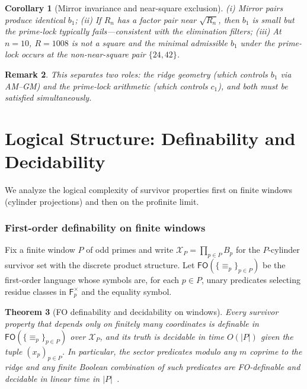 \documentclass[12pt]{article}
\newtheorem{theorem}{Theorem}[section]
\newtheorem{corollary}[theorem]{Corollary}
\newtheorem{remark}[theorem]{Remark}
\numberwithin{equation}{section}
\newcommand{\F}{\mathsf{F}}
\begin{document}
\begin{corollary}[Mirror invariance and near-square exclusion]
(i) Mirror pairs produce identical $b_1$; (ii) If $R_n$ has a factor pair near $\sqrt{R_n}$, then $b_1$ is small but the prime-lock typically fails---consistent with the elimination filters; (iii) At $n=10$, $R=1008$ is not a square and the minimal admissible $b_1$ under the prime-lock occurs at the non-near-square pair $\{24,42\}$.
\end{corollary}

\begin{remark}
This separates two roles: the ridge geometry (which controls $b_1$ via AM--GM) and the prime-lock arithmetic (which controls $c_1$), and both must be satisfied simultaneously.
\end{remark}

\section{Logical Structure: Definability and Decidability}\label{sec:logic-def}
We analyze the logical complexity of survivor properties first on finite windows (cylinder projections) and then on the profinite limit.

\subsubsection{First-order definability on finite windows}\label{subsec:C1-FO}
Fix a finite window $P$ of odd primes and write $\mathscr{X}_P=\prod_{p\in P} B_p$ for the $P$-cylinder survivor set with the discrete product structure. Let $\mathsf{FO}(\{\equiv_p\}_{p\in P})$ be the first-order language whose symbols are, for each $p\in P$, unary predicates selecting residue classes in $\F_p^{\times}$ and the equality symbol.

\begin{theorem}[FO definability and decidability on windows]\label{thm:fo-window}
Every survivor property that depends only on finitely many coordinates is definable in $\mathsf{FO}(\{\equiv_p\}_{p\in P})$ over $\mathscr{X}_P$, and its truth is decidable in time $O(|P|)$ given the tuple $(x_p)_{p\in P}$. In particular, the sector predicates modulo any $m$ coprime to the ridge and any finite Boolean combination of such predicates are FO-definable and decidable in linear time in $|P|$~\cite{SpivackUGPFormalization,ugp-lean}.
\end{theorem}
\end{document}
